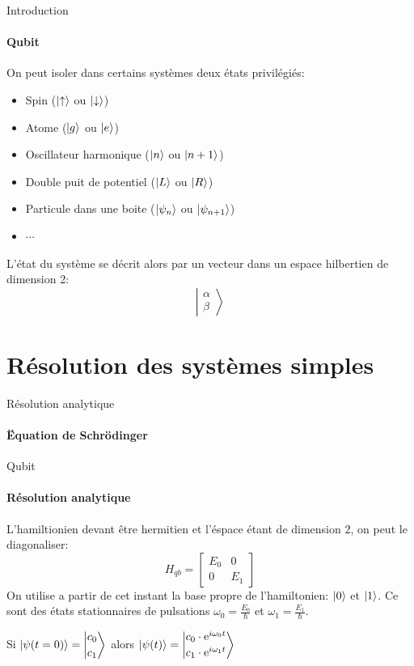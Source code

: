 \documentclass[11pt]{beamer}
\newcommand{\qb}[2]{\ensuremath{\left|\begin{matrix*}[l]
#1\\[2pt]#2
\end{matrix*}\right>}}
\begin{document}
\begin{frame}{Introduction}
\framesubtitle{Qubit}
On peut isoler dans certains systèmes deux états privilégiés:\begin{itemize}
\item Spin ($\ket{\uparrow}$ ou $\ket{\downarrow}$)
\item Atome ($\ket{g}$ ou $\ket{e}$)
\item Oscillateur harmonique ($\ket{n}$ ou $\ket{n+1}$)
\item Double puit de potentiel ($\ket{L}$ ou $\ket{R}$)
\item Particule dans une boite ($\ket{\psi_n}$ ou $\ket{\psi_{n+1}}$)
\item $\cdots$
\end{itemize}
L'état du système se décrit alors par un vecteur dans un espace hilbertien de dimension 2: 
\[
\left|\begin{matrix}
\alpha \\ \beta
\end{matrix}\right>
\]
\end{frame}


\section{Résolution des systèmes simples}

\begin{frame}{Résolution analytique}
\framesubtitle{Ëquation de Schrödinger}
\end{frame}

\begin{frame}{Qubit}
\framesubtitle{Résolution analytique}
L'hamiltionien devant être hermitien et l'éspace étant de dimension 2, on peut le diagonaliser:
\[
H_{qb}=\begin{bmatrix}
E_0&0\\
0&E_1
\end{bmatrix}
\]
On utilise a partir de cet instant la base propre de l'hamiltonien: $\ket{0}$ et $\ket{1}$.
Ce sont des états stationnaires de pulsations $\omega_0=\frac{E_0}{\hbar}$ et $\omega_1=\frac{E_1}{\hbar}$.\vspace{0.5em}

Si $\ket{\psi(t=0)}=\qb{c_0}{c_1}$ alors $\ket{\psi(t)}=\qb{c_0\cdot\textrm{e}^{i\omega_0 t}}{c_1\cdot\textrm{e}^{i\omega_1 t}}$
\end{frame}
\end{document}
